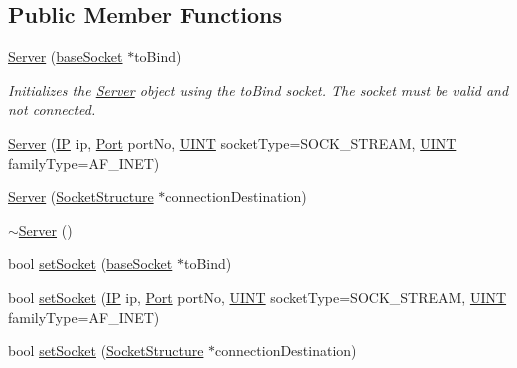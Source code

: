 \subsection*{Public Member Functions}
\begin{DoxyCompactItemize}
\item 
\hyperlink{class_communication_1_1_server_a1b8f8c80fa15d3e171ad5807d6c4da42}{Server} (\hyperlink{class_communication_1_1base_socket}{base\+Socket} $\ast$to\+Bind)
\begin{DoxyCompactList}\small\item\em Initializes the \hyperlink{class_communication_1_1_server}{Server} object using the to\+Bind socket. The socket must be valid and not connected. \end{DoxyCompactList}\item 
\hyperlink{class_communication_1_1_server_ae0edf16a55b4271c76180deae2137b0a}{Server} (\hyperlink{class_communication_1_1_i_p}{I\+P} ip, \hyperlink{class_communication_1_1_port}{Port} port\+No, \hyperlink{typedefs_8h_a2e2c38961834f28c06e17e074eb00bc7}{U\+I\+N\+T} socket\+Type=S\+O\+C\+K\+\_\+\+S\+T\+R\+E\+A\+M, \hyperlink{typedefs_8h_a2e2c38961834f28c06e17e074eb00bc7}{U\+I\+N\+T} family\+Type=A\+F\+\_\+\+I\+N\+E\+T)
\item 
\hyperlink{class_communication_1_1_server_a6cde5340b15595739ffb72ab2f600928}{Server} (\hyperlink{class_communication_1_1_socket_structure}{Socket\+Structure} $\ast$connection\+Destination)
\item 
\hyperlink{class_communication_1_1_server_aef74c77dc02436ee1dc6d16310837b12}{$\sim$\+Server} ()
\item 
bool \hyperlink{class_communication_1_1_server_a875eb11ac955e00739cd4596aa670e4a}{set\+Socket} (\hyperlink{class_communication_1_1base_socket}{base\+Socket} $\ast$to\+Bind)
\item 
bool \hyperlink{class_communication_1_1_server_a30bee0cf7df458c9b0c512bd48129e88}{set\+Socket} (\hyperlink{class_communication_1_1_i_p}{I\+P} ip, \hyperlink{class_communication_1_1_port}{Port} port\+No, \hyperlink{typedefs_8h_a2e2c38961834f28c06e17e074eb00bc7}{U\+I\+N\+T} socket\+Type=S\+O\+C\+K\+\_\+\+S\+T\+R\+E\+A\+M, \hyperlink{typedefs_8h_a2e2c38961834f28c06e17e074eb00bc7}{U\+I\+N\+T} family\+Type=A\+F\+\_\+\+I\+N\+E\+T)
\item 
bool \hyperlink{class_communication_1_1_server_aea8579d23e3b7d0090acebec5dffaca9}{set\+Socket} (\hyperlink{class_communication_1_1_socket_structure}{Socket\+Structure} $\ast$connection\+Destination)
\item 

\end{DoxyCompactItemize}
